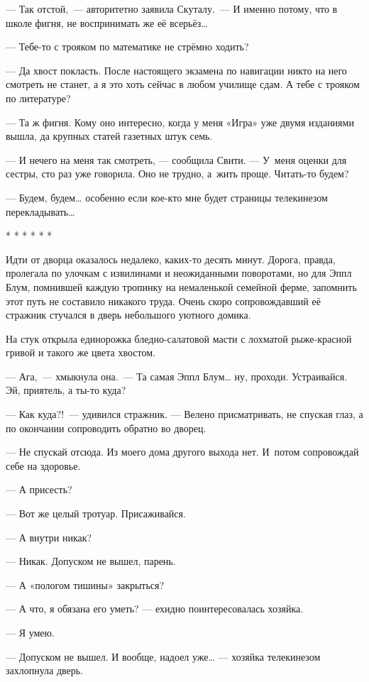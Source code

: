 \documentclass[fontsize=11pt,a5paper,titlepage=firstcover]{scrbook}
\begin{document}
--- Так отстой,~--- авторитетно заявила Скуталу.~--- И именно потому, что в школе фигня, не воспринимать же её всерьёз{\ldots}

--- Тебе-то с трояком по математике не стрёмно ходить?

--- Да хвост покласть. После настоящего экзамена по навигации никто на него смотреть не станет, а я это хоть сейчас в любом училище сдам. А тебе с трояком по литературе?

--- Та ж фигня. Кому оно интересно, когда у меня «Игра» уже двумя изданиями вышла, да крупных статей газетных штук семь.

--- И нечего на меня так смотреть, --- сообщила Свити. --- У~меня оценки для сестры, сто раз уже говорила. Оно не трудно, а~жить проще. Читать-то будем?

--- Будем, будем{\ldots} особенно если кое-кто мне будет страницы телекинезом перекладывать{\ldots}
\begin{center}* * * * * *\end{center}

Идти от дворца оказалось недалеко, каких-то десять минут. Дорога, правда, пролегала по улочкам с извилинами и неожиданными поворотами, но для Эппл Блум, помнившей каждую тропинку на немаленькой семейной ферме, запомнить этот путь не составило никакого труда. Очень скоро сопровождавший её стражник стучался в дверь небольшого уютного домика.

На стук открыла единорожка бледно-салатовой масти с лохматой рыже-красной гривой и такого же цвета хвостом.

--- Ага,~--- хмыкнула она.~--- Та самая Эппл Блум{\ldots} ну, проходи. Устраивайся. Эй, приятель, а ты-то куда?

--- Как куда?!~--- удивился стражник. --- Велено присматривать, не спуская глаз, а по окончании сопроводить обратно во дворец.

--- Не спускай отсюда. Из моего дома другого выхода нет. И~потом сопровождай себе на здоровье.

--- А присесть?

--- Вот же целый тротуар. Присаживайся.

--- А внутри никак?

--- Никак. Допуском не вышел, парень.

--- А «пологом тишины» закрыться?

--- А что, я обязана его уметь? --- ехидно поинтересовалась хозяйка.

--- Я умею.

--- Допуском не вышел. И вообще, надоел уже{\ldots} --- хозяйка телекинезом захлопнула дверь.
\end{document}
